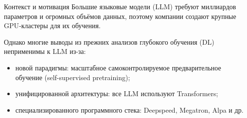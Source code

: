 \begin{frame}{Контекст и мотивация}
	Большие языковые модели (LLM) требуют миллиардов параметров и огромных объёмов данных, 
	поэтому компании создают крупные GPU‑кластеры для их обучения.
	
	Однако многие выводы из прежних анализов глубокого обучения (DL) неприменимы к LLM из-за:
	\begin{itemize}
		\item новой парадигмы: масштабное самоконтролируемое предварительное обучение (self-supervised pretraining);
		\item унифицированной архитектуры: все LLM используют Transformers;
		\item специализированного программного стека: Deepspeed, Megatron, Alpa и др.
	\end{itemize}
\end{frame}